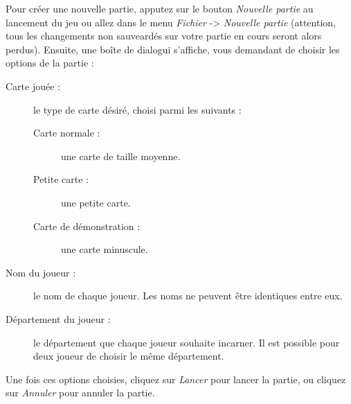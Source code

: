 Pour créer une nouvelle partie, apputez sur le bouton \emph{Nouvelle partie} au lancement du jeu ou allez dans le menu \emph{Fichier} -> \emph{Nouvelle partie} (attention, tous les changements non sauveardés sur votre partie en cours seront alors perdus).
Ensuite, une boîte de dialogui s'affiche, vous demandant de choisir les options de la partie :

\begin{description}
	\item[Carte jouée :] le type de carte désiré, choisi parmi les suivants :
	\begin{description}
		\item[Carte normale :] une carte de taille moyenne.
		\item[Petite carte :] une petite carte.
		\item[Carte de démonstration :] une carte minuscule.
	\end{description}

	\item[Nom du joueur :] le nom de chaque joueur. Les noms ne peuvent être identiques entre eux.

	\item[Département du joueur :] le département que chaque joueur souhaite incarner. Il est possible pour deux joueur de choisir le même département.
\end{description}

Une fois ces options choisies, cliquez sur \emph{Lancer} pour lancer la partie, ou cliquez sur \emph{Annuler} pour annuler la partie.